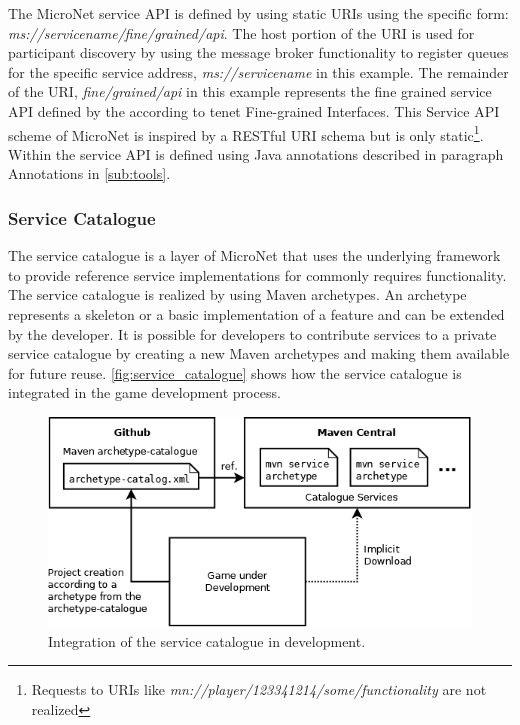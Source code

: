 The MicroNet service API is defined by using static URIs using the specific
form: \textit{ms://servicename/fine/grained/api}. The host portion of the URI is
used for participant discovery by using the message broker functionality to
register queues for the specific service address, \textit{ms://servicename} in
this example. The remainder of the URI, \textit{fine/grained/api} in this
example represents the fine grained service API defined by the \ms{} according
to tenet Fine-grained Interfaces. This Service API scheme of MicroNet is
inspired by a RESTful URI schema but is only static\footnote{Requests to URIs
like \textit{mn://player/123341214/some/functionality} are not realized}. Within
\mss{} the service API is defined using Java annotations described in paragraph
Annotations in \autoref{sub:tools}.

\subsubsection{Service Catalogue}

The service catalogue is a layer of MicroNet that uses the underlying framework
to provide reference service implementations for commonly requires
functionality. The service catalogue is realized by using Maven archetypes. An
archetype represents a skeleton or a basic implementation of a feature and can
be extended by the developer. It is possible for developers to contribute
services to a private service catalogue by creating a new Maven archetypes and
making them available for future reuse. \autoref{fig:service_catalogue} shows
how the service catalogue is integrated in the game development process.

\begin{figure}
	\centering
	\includegraphics[width=12cm]{images/architecture/ServiceCatalogue}
	\caption{Integration of the service catalogue in \og{} development.}
	\label{fig:service_catalogue}
\end{figure}

